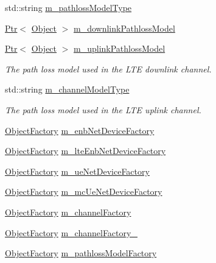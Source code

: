 \begin{DoxyCompactItemize}
\item 
std\+::string \hyperlink{classns3_1_1MmWaveHelper_a7f17e9bc4797b51d9a31d16c7e667960}{m\+\_\+pathloss\+Model\+Type}
\item 
\hyperlink{classns3_1_1Ptr}{Ptr}$<$ \hyperlink{classns3_1_1Object}{Object} $>$ \hyperlink{classns3_1_1MmWaveHelper_aa6554e23ddc0a9bdadb5ea91f85307b0}{m\+\_\+downlink\+Pathloss\+Model}
\item 
\hyperlink{classns3_1_1Ptr}{Ptr}$<$ \hyperlink{classns3_1_1Object}{Object} $>$ \hyperlink{classns3_1_1MmWaveHelper_a13bd21e36e3ef9f3c11aeca4eef3fc36}{m\+\_\+uplink\+Pathloss\+Model}
\begin{DoxyCompactList}\small\item\em The path loss model used in the L\+TE downlink channel. \end{DoxyCompactList}\item 
std\+::string \hyperlink{classns3_1_1MmWaveHelper_aec88d691230f0db9448a7f953301bb24}{m\+\_\+channel\+Model\+Type}
\begin{DoxyCompactList}\small\item\em The path loss model used in the L\+TE uplink channel. \end{DoxyCompactList}\item 
\hyperlink{classns3_1_1ObjectFactory}{Object\+Factory} \hyperlink{classns3_1_1MmWaveHelper_adaf4ba456a6dda3d359b5105a0df1c22}{m\+\_\+enb\+Net\+Device\+Factory}
\item 
\hyperlink{classns3_1_1ObjectFactory}{Object\+Factory} \hyperlink{classns3_1_1MmWaveHelper_a4434a934b52d68cf43b6a9d46690ad2f}{m\+\_\+lte\+Enb\+Net\+Device\+Factory}
\item 
\hyperlink{classns3_1_1ObjectFactory}{Object\+Factory} \hyperlink{classns3_1_1MmWaveHelper_aac0d84004f3793855cccd64f0c42ff34}{m\+\_\+ue\+Net\+Device\+Factory}
\item 
\hyperlink{classns3_1_1ObjectFactory}{Object\+Factory} \hyperlink{classns3_1_1MmWaveHelper_a678f7c6a79f1024bf09a2dc561ae87f5}{m\+\_\+mc\+Ue\+Net\+Device\+Factory}
\item 
\hyperlink{classns3_1_1ObjectFactory}{Object\+Factory} \hyperlink{classns3_1_1MmWaveHelper_aefd1af1d339f1de2d8b09811162cb554}{m\+\_\+channel\+Factory}
\item 
\hyperlink{classns3_1_1ObjectFactory}{Object\+Factory} \hyperlink{classns3_1_1MmWaveHelper_a0c4288dc1347ccc5de81b9ee0f175faf}{m\+\_\+channel\+Factory\+\_}
\item 
\hyperlink{classns3_1_1ObjectFactory}{Object\+Factory} \hyperlink{classns3_1_1MmWaveHelper_a11109a98a7fe9fb7e0c63e891dd50e3c}{m\+\_\+pathloss\+Model\+Factory}

\end{DoxyCompactItemize}
